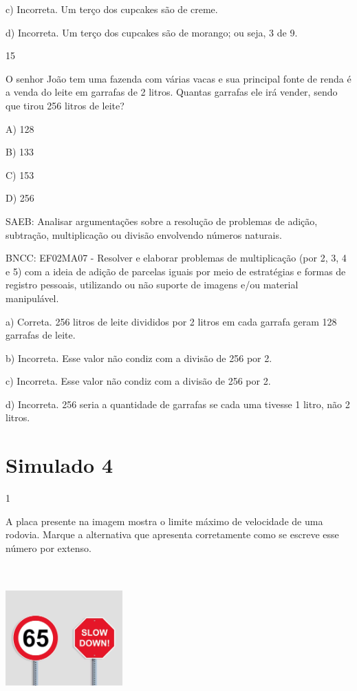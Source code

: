 \begin{escolha}
\begin{escolha}
{{{{{{{{c) Incorreta. Um terço dos cupcakes são de creme.

d) Incorreta. Um terço dos cupcakes são de morango; ou seja, 3 de 9.

\num{15}

O senhor João tem uma fazenda com várias vacas e sua principal fonte de renda é a venda do leite em garrafas de 2 litros. Quantas
garrafas ele irá vender, sendo que tirou 256 litros de leite?

A) 128

B) 133

C) 153

D) 256

SAEB: Analisar argumentações sobre a resolução de problemas de
adição, subtração, multiplicação ou divisão envolvendo números naturais.

BNCC: EF02MA07 - Resolver e elaborar problemas de multiplicação (por 2,
3, 4 e 5) com a ideia de adição de parcelas iguais por meio de
estratégias e formas de registro pessoais, utilizando ou não suporte de
imagens e/ou material manipulável.

a) Correta. 256 litros de leite divididos por 2 litros em cada garrafa geram 128 garrafas de leite.

b) Incorreta. Esse valor não condiz com a divisão de 256 por 2.

c) Incorreta. Esse valor não condiz com a divisão de 256 por 2.

d) Incorreta. 256 seria a quantidade de garrafas se cada uma tivesse 1 litro, não 2 litros.

\chapter{Simulado 4}

\num{1}

A placa presente na imagem mostra o limite máximo de velocidade de uma
rodovia. Marque a alternativa que apresenta corretamente como se escreve
esse número por extenso.

\includegraphics[width=1.77359in,height=2.21876in]{media/image162.png}

}}}}}}}}
\end{escolha}
\end{escolha}
